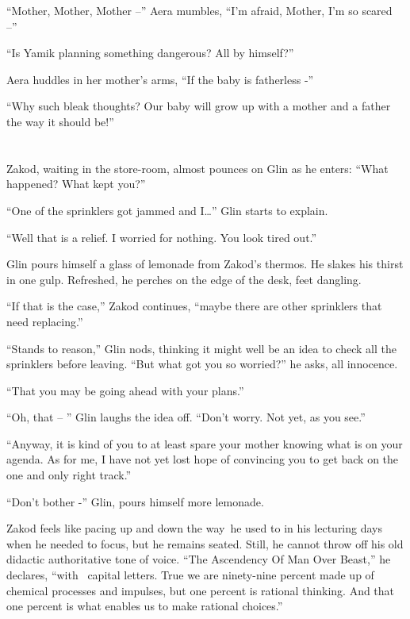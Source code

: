 \documentclass[twoside,11pt]{book}
\begin{document}
``Mother, Mother, Mother --'' Aera mumbles, ``I'm afraid, Mother, I'm so scared
--''

``Is Yamik planning something dangerous? All by himself?''

Aera huddles in her mother's arms, ``If the baby is fatherless -''

``Why such bleak thoughts? Our baby will grow up with a mother and a father the way it should
be!''


\bigskip

\chapter{}

Zakod, waiting in the store-room, almost pounces on Glin as he enters: ``What happened? What kept
you?''

``One of the sprinklers got jammed and I{\dots}'' Glin starts to explain.

``Well that is a relief. I worried for nothing. You look tired out.''

Glin pours himself a glass of lemonade from Zakod's thermos. He{ }slakes his
thirst in one gulp. Refreshed, he perches on the edge of the desk, feet dangling.

{}``If that is the case,'' Zakod continues, ``maybe there are other sprinklers that need replacing.''

``Stands to reason,'' Glin nods, thinking it might well be an idea to check all the sprinklers
before leaving. ``But what got you so worried?'' he asks, all innocence.

``That you may be going ahead with your plans.''

``Oh, that -- '' Glin laughs the idea off. ``Don't worry. Not yet, as you
see.''

``Anyway, it is kind of you to at least spare your mother knowing what is on your agenda. As for me, I have
not yet lost hope of convincing you to get back on the one and only right track.''

``Don't bother -'' Glin, pours himself more lemonade.

Zakod feels like pacing up and down the way~he used to in his lecturing days when he needed to focus, but he remains
seated. Still, he cannot throw off his old didactic authoritative tone of voice. ``The Ascendency Of Man
Over Beast,'' he declares, ``with \ capital letters. True we are ninety-nine percent made up of chemical
processes and impulses, but one percent is rational thinking. And that one percent is what enables us to make rational
choices.''
\end{document}
